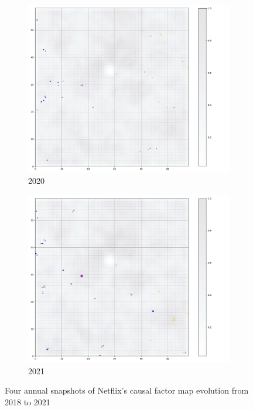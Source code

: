 \begin{figure}
     \hfill
     \begin{subfigure}[b]{0.45\textwidth}
         \centering
         \includegraphics[width=\textwidth]{figures/NFLX_20.png}
         \caption{2020}
     \end{subfigure}
     \hfill
     \begin{subfigure}[b]{0.45\textwidth}
         \centering
         \includegraphics[width=\textwidth]{figures/NFLX_21.png}
         \caption{2021}
     \end{subfigure}
        \caption{Four annual snapshots of Netflix's causal factor map evolution from 2018 to 2021}
        \label{fig:netflixlast4}

\end{figure}




